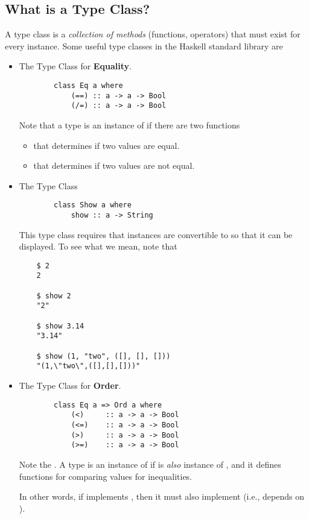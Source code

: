 \documentclass[letterpaper]{article}
\begin{document}
\subsection{What is a Type Class?}
A type class is a \emph{collection of methods} (functions, operators) that must exist for every instance. Some useful type classes in the Haskell standard library are
\begin{itemize}
    \item The  Type Class for \textbf{Equality}.
    \begin{verbatim}
        class Eq a where 
            (==) :: a -> a -> Bool 
            (/=) :: a -> a -> Bool \end{verbatim}
    Note that a type  is an instance of  if there are two functions 
    \begin{itemize}
        \item {} that determines if two  values are equal. 
        \item {} that determines if two  values are not equal. 
    \end{itemize}

    \item The  Type Class 
    \begin{verbatim}
        class Show a where 
            show :: a -> String \end{verbatim}
    This type class requires that instances are convertible to  so that it can be displayed. To see what we mean, note that 
    \begin{verbatim}
    $ 2
    2

    $ show 2
    "2"

    $ show 3.14 
    "3.14"

    $ show (1, "two", ([], [], []))
    "(1,\"two\",([],[],[]))"\end{verbatim}

    \item The  Type Class for \textbf{Order}.
    \begin{verbatim}
        class Eq a => Ord a where 
            (<)     :: a -> a -> Bool
            (<=)    :: a -> a -> Bool
            (>)     :: a -> a -> Bool
            (>=)    :: a -> a -> Bool\end{verbatim}
    Note the . A type  is an instance of  if  is \emph{also} instance of , and it defines functions for comparing values for inequalities. 

    \bigskip 

    In other words, if  implements , then it must also implement  (i.e.,  depends on ).
\end{itemize}
\end{document}
